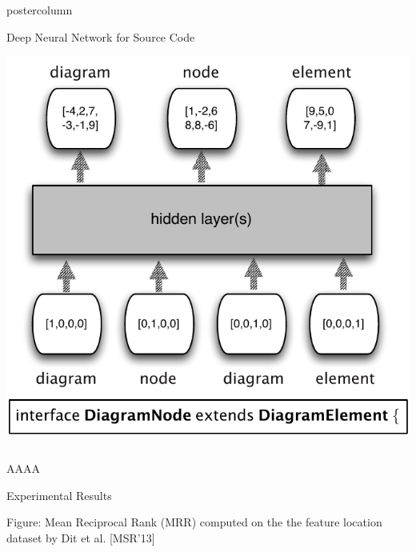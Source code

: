 \documentclass[final]{beamer} %
\begin{document}
\begin{frame}
\begin{columns}[t]
\begin{column}{.49\textwidth}
\begin{beamercolorbox}[center,wd=\textwidth]{postercolumn}
\begin{minipage}[T]{.95\textwidth}
\begin{block}{Deep Neural Network for Source Code}
            \vskip 0.5cm

            \begin{center}
              \includegraphics[width=.9\linewidth]{../figures/neuralnet.pdf}
            \end{center}
          \end{block}
          
          \vskip 1cm
          
        \end{minipage}
      \end{beamercolorbox}
    \end{column}

  \end{columns} 


  \vskip 1cm
    
  \begin{beamercolorbox}[center]{AAAA}
    \begin{minipage}[T]{.97\textwidth}  %
      \begin{block}{Experimental Results}

        \centering
        Figure: Mean Reciprocal Rank (MRR) computed on the the feature location dataset by Dit et al. [MSR'13]\par
        


\end{block}
\end{minipage}
\end{beamercolorbox}
\end{frame}
\end{document}
